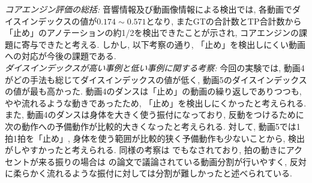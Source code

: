 \documentclass[technicalreport]{ieicej}
\begin{document}
\emph{コアエンジン評価の総括: }音響情報及び動画像情報による検出では, 各動画でダイスインデックスの値が$0.174\sim0.571$となり, またGTの合計数とTP合計数から「止め」のアノテーションの約1/2を検出できたことが示され, コアエンジンの課題に寄与できたと考える. しかし, 以下考察の通り, 「止め」を検出しにくい動画への対応が今後の課題である.\\
\emph{ダイスインデックスが高い事例と低い事例に関する考察: }今回の実験では, 動画4がどの手法も総じてダイスインデックスの値が低く, 動画5のダイスインデックスの値が最も高かった. 動画4のダンスは「止め」の動画の繰り返しでありつつも, やや流れるような動きであったため, 「止め」を検出しにくかったと考えられる. また, 動画4のダンスは身体を大きく使う振付になっており, 反動をつけるために次の動作への予備動作が比較的大きくなったと考えられる. 対して, 動画5では1拍1拍を「止め」, 身体を使う範囲が比較的狭く予備動作も少ないことから, 検出がしやすかったと考えられる. 同様の考察は \cite{ref16}でもなされており, 拍の動きにアクセントが来る振りの場合は \cite{ref16}の論文で議論されている動画分割が行いやすく, 反対に柔らかく流れるような振付に対しては分割が難しかったと述べられている. 
\end{document}
